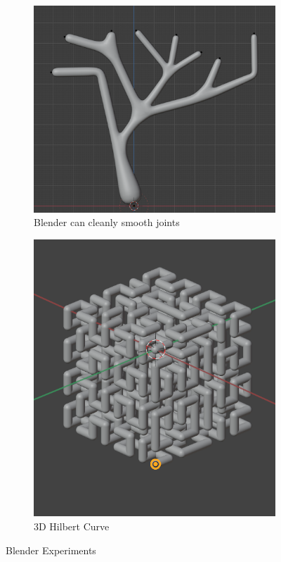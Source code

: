 \documentclass[12pt,twoside]{reedthesis}
\begin{document}
	\begin{figure}[h]
	\centering
	\begin{subfigure}{0.55\linewidth}
		\centering
		\includegraphics[width=\linewidth]{Images/Blender1}
		\caption{Blender can cleanly smooth joints}
		\label{SmoothTree}
	\end{subfigure}%
	\hfill
	\begin{subfigure}{0.41\linewidth}
		\centering
		\includegraphics[width=\linewidth]{Images/3DHilbert}
		\caption{3D Hilbert Curve}
		\label{3DHilbert}
	\end{subfigure}
	\caption{Blender Experiments}
	\label{BlenderImages}
	\end{figure}
	
\end{document}
